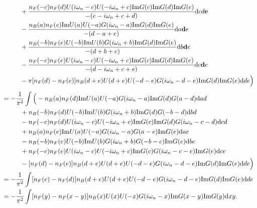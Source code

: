 \documentclass[12pt,a4paper]{scrartcl}
\numberwithin{equation}{section}
\begin{document}
\begin{align}
&\hspace*{1cm} +\frac{n_F(-c)n_F(d)U(i\omega_n-c)U(-i\omega_n+c)\mathrm{Im}G(c)\mathrm{Im}G(d)\mathrm{Im}G(e)}{-(e-i\omega_n+c+d) }\mathrm{d}cd\textbf{e} \nonumber \\
%
&\hspace*{1cm} -\frac{n_B(a)n_F(e)\mathrm{Im}U(a)U(-a)G(i\omega_n-a)\mathrm{Im}G(d)\mathrm{Im}G(e)}{-(d-a+e) } \mathrm{d}a\textbf{d}e\nonumber \\
&\hspace*{1cm} +\frac{n_B(-b)n_F(e)U(-b)\mathrm{Im}U(b)G(i\omega_n+b)\mathrm{Im}G(d)\mathrm{Im}G(e)}{ -(d+b+e) } \mathrm{d}b\textbf{d}e\nonumber \\
&\hspace*{1cm} -\frac{n_F(-c)n_F(e)U(i\omega_n-c)U(-i\omega_n+c)\mathrm{Im}G(c)\mathrm{Im}G(d)\mathrm{Im}G(e)}{-(d-i\omega_n+c+e) }\mathrm{d}c\textbf{d}e \nonumber \\
%
&\hspace*{1cm} -\pi[n_F(d)-n_F(e)] n_B(d+e)U(d+e)U(-d-e)G(i\omega_n-d-e)\mathrm{Im}G(d)\mathrm{Im}G(e)  \mathrm{d}de
    \Big)  %
\end{align}
\begin{align}
 &= -\frac{1}{\pi^2} \int \Big( 
               -n_B(a)n_F(d)\mathrm{Im}U(a)U(-a)G(i\omega_n-a)\mathrm{Im}G(d)G(a-d) \mathrm{d}ad\nonumber \\
&\hspace*{1cm} +n_B(-b)n_F(d)U(-b)\mathrm{Im}U(b)G(i\omega_n+b)\mathrm{Im}G(d)G(-b-d) \mathrm{d}bd\nonumber \\
&\hspace*{1cm} -n_F(-c)n_F(d)U(i\omega_n-c)U(-i\omega_n+c)\mathrm{Im}G(c)\mathrm{Im}G(d)G(i\omega_n-c-d)\mathrm{d}cd \nonumber \\
%
&\hspace*{1cm} +n_B(a)n_F(e)\mathrm{Im}U(a)U(-a)G(i\omega_n-a)G(a-e)\mathrm{Im}G(e) \mathrm{d}ae\nonumber \\
&\hspace*{1cm} -n_B(-b)n_F(e)U(-b)\mathrm{Im}U(b)G(i\omega_n+b)G(-b-e)\mathrm{Im}G(e) \mathrm{d}be\nonumber \\
&\hspace*{1cm} +n_F(-c)n_F(e)U(i\omega_n-c)U(-i\omega_n+c)\mathrm{Im}G(c)G(i\omega_n-c-e)\mathrm{Im}G(e) \mathrm{d}ce \nonumber \\
%
&\hspace*{1cm} - [n_F(d)-n_F(e)]n_B(d+e)U(d+e)U(-d-e)G(i\omega_n-d-e)\mathrm{Im}G(d)\mathrm{Im}G(e)  \mathrm{d}de
    \Big)      \\
%
 &= -\frac{1}{\pi^2} \int [n_F(e)-n_F(d)] n_B(d+e)U(d+e)U(-d-e)G(i\omega_n-d-e)\mathrm{Im}G(d)\mathrm{Im}G(e)  \mathrm{d}de \\ 
 &= -\frac{1}{\pi^2} \int [n_F(y)-n_F(x-y)] n_B(x)U(x)U(-x)G(i\omega_n-x)\mathrm{Im}G(x-y)\mathrm{Im}G(y)  \mathrm{d}xy .
\end{align}
\end{document}
